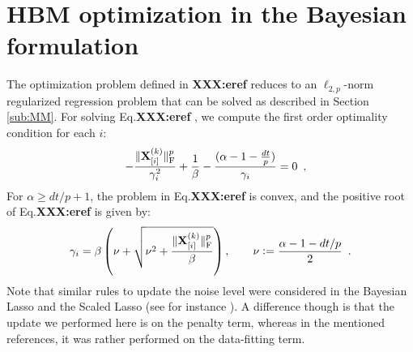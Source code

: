 

\section{HBM optimization in the Bayesian formulation}
\label{sub:optimization}

The optimization problem defined in \textbf{XXX:eref}%
 reduces to an $\ell_{2,p}$-norm regularized regression problem that can be solved as described in Section \ref{sub:MM}. For solving Eq.\textbf{XXX:eref}%
 , we compute the first order optimality condition for each $i$:
\begin{eqnarray}
\label{eq:OptiGamma}
\qquad - \frac{\fronorm{\bfX^{(k)}_{[i]}}^p}{\gamma_i^2} + \frac{1}{\beta} - \frac{( \alpha - 1 - \frac{dt}{p})}{\gamma_i} &= 0 \enspace,\label{eq:OptiGammaFirst}%
\end{eqnarray}
For $\alpha \geqslant d t/p + 1$, the problem in Eq.\textbf{XXX:eref}%
 is convex, and the positive root of Eq.\textbf{XXX:eref}%
  is given by:
\begin{equation}
\gamma_i = \beta \left( \nu + \sqrt{ \nu^2 + \frac{\|{\mathbf{X}^{(k)}_{[i]}}\|_{\rm F}^p}{\beta}} \right), \qquad \nu \mathrel{\mathop:}= \frac{\alpha - 1 - dt/p}{2} \enspace.
\end{equation}
Note that similar rules to update the noise level were considered in the Bayesian Lasso \cite{Park_Casella08,Kyung_Gill_Ghosh_Casella10} and the Scaled Lasso (see for instance \cite{Stadler_Buhlmann_vandeGeer10,Dalalyan12}). A difference though is that the update we performed here is on the penalty term, whereas in the mentioned references, it was rather performed on the data-fitting term.


